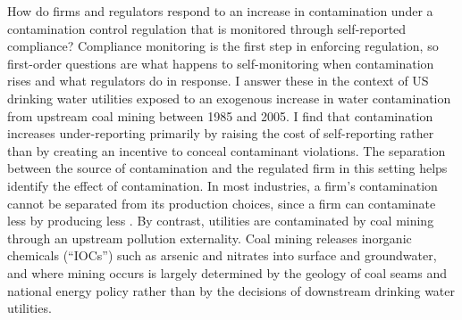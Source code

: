 \documentclass[12pt]{article}
\begin{document}
How do firms and regulators respond to an increase in contamination under a contamination control regulation that is monitored through self-reported compliance? Compliance monitoring is the first step in enforcing regulation, so first-order questions are what happens to self-monitoring when contamination rises and what regulators do in response. I answer these in the context of US drinking water utilities exposed to an exogenous increase in water contamination from upstream coal mining between 1985 and 2005. I find that contamination increases under-reporting primarily by raising the cost of self-reporting rather than by creating an incentive to conceal contaminant violations. The separation between the source of contamination and the regulated firm in this setting helps identify the effect of contamination. In most industries, a firm's contamination cannot be separated from its production choices, since a firm can contaminate less by producing less \parencite{bennear2005strategic}. By contrast, utilities are contaminated by coal mining through an upstream pollution externality. Coal mining releases inorganic chemicals (``IOCs'') such as arsenic and nitrates into surface and groundwater, and where mining occurs is largely determined by the geology of coal seams and national energy policy rather than by the decisions of downstream drinking water utilities.
\end{document}
